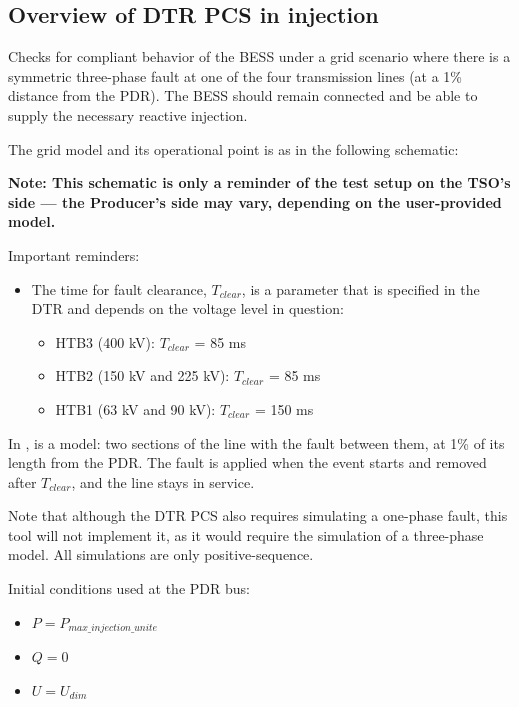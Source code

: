    \subsection{Overview of DTR PCS \DTRPcs{} in injection}

    Checks for compliant behavior of the BESS under a grid scenario where there
    is a symmetric three-phase fault at one of the four transmission lines
    (at a 1\% distance from the PDR). The BESS should remain connected and
    be able to supply the necessary reactive injection.

    The grid model and its operational point is as in the following schematic:
    \begin{center}
        
    \end{center}
    \begin{center}
        \small \textbf{Note: This schematic is only a reminder of the test setup on the TSO's
        side --- the Producer's side may vary, depending on the user-provided model.}
    \end{center}

    \noindent Important reminders:
    \begin{itemize}
        \item The time for fault clearance, $T_{clear}$, is a parameter that
        is specified in the DTR and depends on the voltage level in
        question:
        \begin{itemize}
            \item HTB3 (400 kV): $T_{clear}$ = 85 ms
            \item HTB2 (150 kV and 225 kV): $T_{clear}$ = 85 ms
            \item HTB1 (63 kV and 90 kV): $T_{clear}$ = 150 ms
        \end{itemize}
    \end{itemize}

    In \Dynawo{},  is a  model: two sections of the
    line with the fault between them, at 1\% of its length from the PDR. The
    fault is applied when the event starts and removed after $T_{clear}$, and the
    line stays in service.

    Note that although the DTR PCS also requires simulating a one-phase
    fault, this tool will not implement it, as it would require the
    simulation of a three-phase model. All simulations are only
    positive-sequence.

    \begin{description}
        \item Initial conditions used at the PDR bus:
        \begin{itemize}
            \item $P = P_{max\_injection\_unite}$
            \item $Q = 0$
            \item $U = U_{dim}$
        \end{itemize}
    \end{description}

